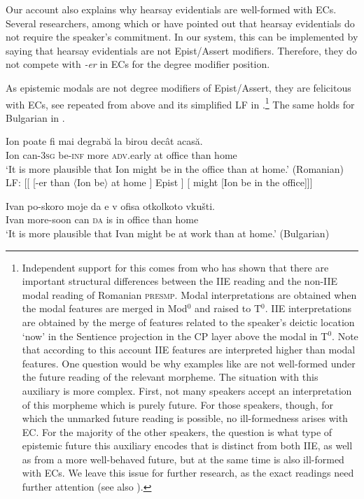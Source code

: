 \documentclass[output=paper,
]{langscibook}
\begin{document}
\noindent Our account also explains why hearsay evidentials are well-formed with ECs. Several researchers, among which \citet{fall02} or \citet{smir13} have pointed out that hearsay evidentials do not require the speaker's commitment. In our system, this can be implemented by saying that hearsay evidentials are not Epist/Assert modifiers. Therefore, they do not compete with \textit{-er} in ECs for the degree modifier position.
        
 As epistemic modals are not degree modifiers of Epist/Assert, they are felicitous with ECs, see  repeated from above and its simplified LF in .\footnote{Independent support for this comes from \citet{iri18} who has shown that there are important structural differences between the IIE reading and the non-IIE modal reading of Romanian \textsc{presmp}. Modal interpretations are obtained when the modal features are merged in Mod$^0$ and raised to T$^0$. IIE interpretations are obtained by the merge of features related to the speaker's deictic location `now' in the  Sentience projection in the CP layer above the modal in T$^0$. Note that according to this account IIE features are interpreted higher than modal features. One question would be why examples like  are not well-formed under the future reading of the relevant morpheme. The situation with this auxiliary is more complex. First, not many speakers accept an interpretation of this morpheme which is purely future. For those speakers, though, for which the unmarked future reading is possible, no ill-formedness arises with EC. For the majority of the other speakers, the question is what type of epistemic future this auxiliary encodes that is distinct from both IIE, as well as from a more well-behaved future, but at the same time is also ill-formed with ECs. We leave this issue for further research, as the exact readings need further attention (see also \citealt{mih13}).
} 
The same holds for Bulgarian in . 

 	\ea \ea \gll Ion poate fi mai degrabă la birou decât acasă.  \\
Ion 	can-\textsc{3sg} be-\textsc{inf} more \textsc{adv}.early at office than home \\ 
		\glt `It is more plausible that Ion might be in the office than at home.' \hfill (Romanian) \label{mightroma}
   	 \ex LF: [[ { [-er than $\langle$Ion be$\rangle$ at home ] } Epist ] [ might [Ion be in the office]]] \label{mightromb}
     \z \z 
    
	\ea \gll Ivan po-skoro moje da e 	v	ofisa	otkolkoto vkušti.  \\	
Ivan	more-soon	can \textsc{da} is 	in	office	than home \\ 
        \glt `It is more plausible that Ivan might be at work than at home.' \hfill (Bulgarian) \label{mightbul}
        \z 
\end{document}
